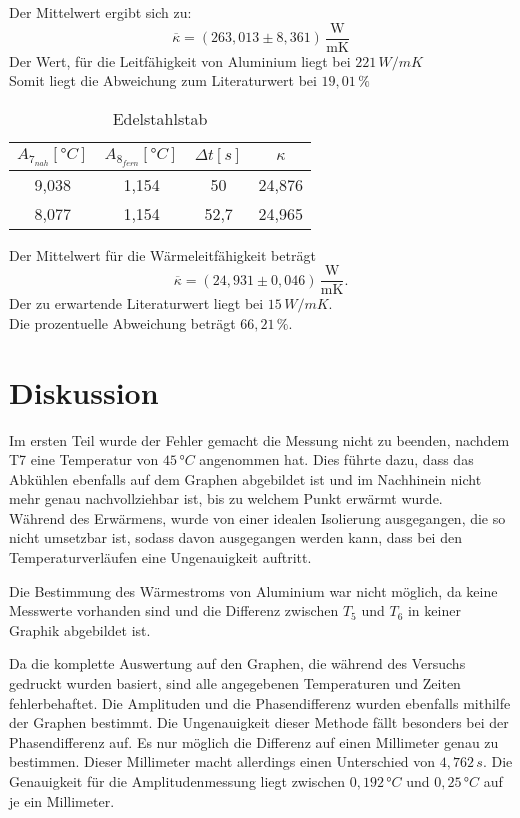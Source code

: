 Der Mittelwert ergibt sich zu:
\begin{equation}
\overline \kappa = (263,013\pm 8,361)\, \mathrm{\frac{W}{mK}}
\end{equation}
Der Wert, für die Leitfähigkeit von Aluminium liegt bei $221\, W/mK$ \cite[275]{b1}\\
Somit liegt die Abweichung zum Literaturwert bei $19,01\, \% $
\begin{table}[H]
  \centering
  \caption{Edelstahlstab}
  \label{tab:ed}
  \begin{tabular}{c c c c}
    \toprule $A_{7_{nah}}[°C]$ & $A_{8_{fern}}[°C]$ & $\Delta t[s]$ & $\kappa$ \\
    \midrule
    9,038 & 1,154 & 50   & 24,876 \\
    8,077 & 1,154 & 52,7  & 24,965 \\
    \bottomrule
  \end{tabular}
\end{table}
Der Mittelwert für die Wärmeleitfähigkeit beträgt
\begin{equation}
\overline \kappa = (24,931\pm 0,046)\, \mathrm{\frac{W}{mK}}.
\end{equation}
Der zu erwartende Literaturwert liegt bei $15\, W/mK$. \cite{on2}\\
Die prozentuelle Abweichung beträgt $66,21\, \%$.


\section{Diskussion}
Im ersten Teil wurde der Fehler gemacht die Messung nicht zu beenden, nachdem T7 eine Temperatur von $45\, °C$ angenommen hat.
Dies führte dazu, dass das Abkühlen ebenfalls auf dem Graphen abgebildet ist
und im Nachhinein nicht mehr genau nachvollziehbar ist, bis zu welchem Punkt erwärmt wurde.\\

Während des Erwärmens, wurde von einer idealen Isolierung ausgegangen, die so nicht umsetzbar ist,
sodass davon ausgegangen werden kann, dass bei den Temperaturverläufen eine Ungenauigkeit auftritt.

Die Bestimmung des Wärmestroms von Aluminium war nicht möglich, da keine Messwerte vorhanden sind
und die Differenz zwischen $T_5$ und $T_6$ in keiner Graphik abgebildet ist.

Da die komplette Auswertung auf den Graphen, die während des Versuchs gedruckt wurden
basiert, sind alle angegebenen Temperaturen und Zeiten fehlerbehaftet.
Die Amplituden und die Phasendifferenz wurden ebenfalls mithilfe der Graphen bestimmt.
Die Ungenauigkeit dieser Methode fällt besonders bei der Phasendifferenz auf.
Es nur möglich die Differenz auf einen Millimeter genau zu bestimmen.
Dieser Millimeter macht allerdings einen Unterschied von $4,762\, s$.
Die Genauigkeit für die Amplitudenmessung liegt zwischen $0,192\, °C$ und $0,25\, °C$ auf je ein Millimeter.\\

